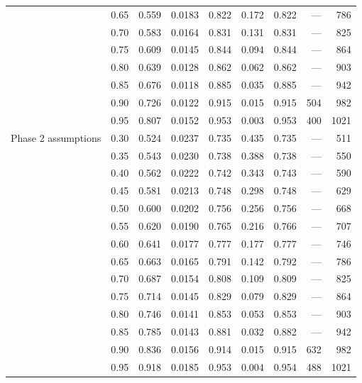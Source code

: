 \begin{table}[htbp]
\begin{tabular}{lrrrrrrrr}
 & 0.65 & 0.559 & 0.0183 & 0.822 & 0.172 & 0.822 & --- & 786 \\
 & 0.70 & 0.583 & 0.0164 & 0.831 & 0.131 & 0.831 & --- & 825 \\
 & 0.75 & 0.609 & 0.0145 & 0.844 & 0.094 & 0.844 & --- & 864 \\
 & 0.80 & 0.639 & 0.0128 & 0.862 & 0.062 & 0.862 & --- & 903 \\
 & 0.85 & 0.676 & 0.0118 & 0.885 & 0.035 & 0.885 & --- & 942 \\
 & 0.90 & 0.726 & 0.0122 & 0.915 & 0.015 & 0.915 & 504 & 982 \\
 & 0.95 & 0.807 & 0.0152 & 0.953 & 0.003 & 0.953 & 400 & 1021 \\
Phase 2 assumptions & 0.30 & 0.524 & 0.0237 & 0.735 & 0.435 & 0.735 & --- & 511 \\
 & 0.35 & 0.543 & 0.0230 & 0.738 & 0.388 & 0.738 & --- & 550 \\
 & 0.40 & 0.562 & 0.0222 & 0.742 & 0.343 & 0.743 & --- & 590 \\
 & 0.45 & 0.581 & 0.0213 & 0.748 & 0.298 & 0.748 & --- & 629 \\
 & 0.50 & 0.600 & 0.0202 & 0.756 & 0.256 & 0.756 & --- & 668 \\
 & 0.55 & 0.620 & 0.0190 & 0.765 & 0.216 & 0.766 & --- & 707 \\
 & 0.60 & 0.641 & 0.0177 & 0.777 & 0.177 & 0.777 & --- & 746 \\
 & 0.65 & 0.663 & 0.0165 & 0.791 & 0.142 & 0.792 & --- & 786 \\
 & 0.70 & 0.687 & 0.0154 & 0.808 & 0.109 & 0.809 & --- & 825 \\
 & 0.75 & 0.714 & 0.0145 & 0.829 & 0.079 & 0.829 & --- & 864 \\
 & 0.80 & 0.746 & 0.0141 & 0.853 & 0.053 & 0.853 & --- & 903 \\
 & 0.85 & 0.785 & 0.0143 & 0.881 & 0.032 & 0.882 & --- & 942 \\
 & 0.90 & 0.836 & 0.0156 & 0.914 & 0.015 & 0.915 & 632 & 982 \\
 & 0.95 & 0.918 & 0.0185 & 0.953 & 0.004 & 0.954 & 488 & 1021 \\
\hline
\end{tabular}
\end{table}
